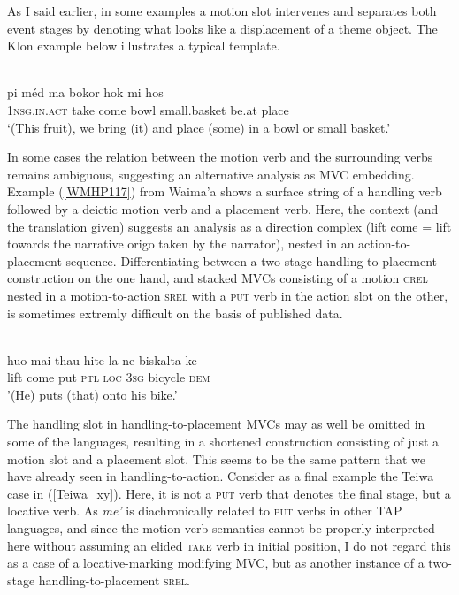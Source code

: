 As I said earlier, in some examples a motion slot intervenes and separates both event stages by denoting what looks like a displacement of a theme object. The Klon example below illustrates a typical template.

\ea \label{}
\\
\gll pi méd ma bokor hok mi hos \\
\textsc{1}\textsc{nsg}.\textsc{in}.\textsc{act} take come bowl small.basket be.at place \\
\glft `(This fruit), we bring (it) and place (some) in a bowl or small basket.'\\ 
\z

In some cases the relation between the motion verb and the surrounding verbs remains ambiguous, suggesting an alternative analysis as MVC embedding. Example (\ref{WMHP117}) from Waima'a shows a surface string of a handling verb followed by a deictic motion verb and a placement verb. Here, the context (and the translation given) suggests an analysis as a direction complex  (lift come = lift towards the narrative origo taken by the narrator), nested in an action-to-placement sequence. Differentiating between a two-stage handling-to-placement construction on the one hand, and stacked MVCs consisting of a motion \textsc{crel} nested in a motion-to-action \textsc{srel} with a \textsc{put} verb in the action slot on the other, is sometimes extremly difficult on the basis of published data.

\ea \label{WMHP117}
\\
\gll huo mai thau hite la ne biskalta ke \\
lift come put \textsc{ptl} \textsc{loc} \textsc{3}\textsc{sg} bicycle \textsc{dem} \\
\glft '(He) puts (that) onto his bike.'\\ 
\z

The handling slot in handling-to-placement MVCs may as well be omitted in some of the languages, resulting in a shortened construction consisting of just a motion slot and a placement slot. This seems to be the same pattern that we have already seen in handling-to-action. Consider as a final example the Teiwa case in (\ref{Teiwa_xy}). Here, it is not a \textsc{put} verb that denotes the final stage, but a locative verb. As \textit{me'} is diachronically related to \textsc{put} verbs in other TAP languages, and since the motion verb semantics cannot be properly interpreted here without assuming an elided \textsc{take} verb in initial position, I do not regard this as a case of a locative-marking modifying MVC, but as another instance of a two-stage handling-to-placement \textsc{srel}.

